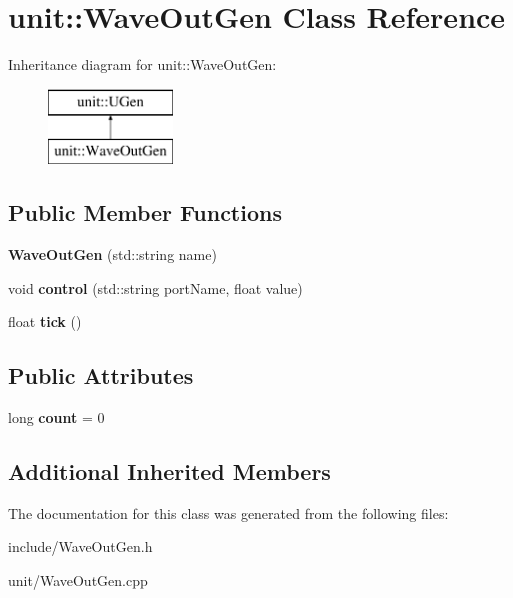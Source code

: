 \hypertarget{classunit_1_1WaveOutGen}{\section{unit\-:\-:Wave\-Out\-Gen Class Reference}
\label{classunit_1_1WaveOutGen}
}
Inheritance diagram for unit\-:\-:Wave\-Out\-Gen\-:\begin{figure}[H]
\begin{center}
\leavevmode
\includegraphics[height=2.000000cm]{classunit_1_1WaveOutGen}
\end{center}
\end{figure}
\subsection*{Public Member Functions}
\begin{DoxyCompactItemize}
\item 
\hypertarget{classunit_1_1WaveOutGen_af7b0343212eb3de1ed4ef2dad90ad43e}{{\bfseries Wave\-Out\-Gen} (std\-::string name)}\label{classunit_1_1WaveOutGen_af7b0343212eb3de1ed4ef2dad90ad43e}

\item 
\hypertarget{classunit_1_1WaveOutGen_a919d71ae0729553b3bd1799add9d1088}{void {\bfseries control} (std\-::string port\-Name, float value)}\label{classunit_1_1WaveOutGen_a919d71ae0729553b3bd1799add9d1088}

\item 
\hypertarget{classunit_1_1WaveOutGen_a468581d97aaf471e6516aee2cdb630cd}{float {\bfseries tick} ()}\label{classunit_1_1WaveOutGen_a468581d97aaf471e6516aee2cdb630cd}

\end{DoxyCompactItemize}
\subsection*{Public Attributes}
\begin{DoxyCompactItemize}
\item 
\hypertarget{classunit_1_1WaveOutGen_ad8ec171f5fa4fabc328b69a2509fde0f}{long {\bfseries count} = 0}\label{classunit_1_1WaveOutGen_ad8ec171f5fa4fabc328b69a2509fde0f}

\end{DoxyCompactItemize}
\subsection*{Additional Inherited Members}


The documentation for this class was generated from the following files\-:\begin{DoxyCompactItemize}
\item 
include/Wave\-Out\-Gen.\-h\item 
unit/Wave\-Out\-Gen.\-cpp\end{DoxyCompactItemize}
